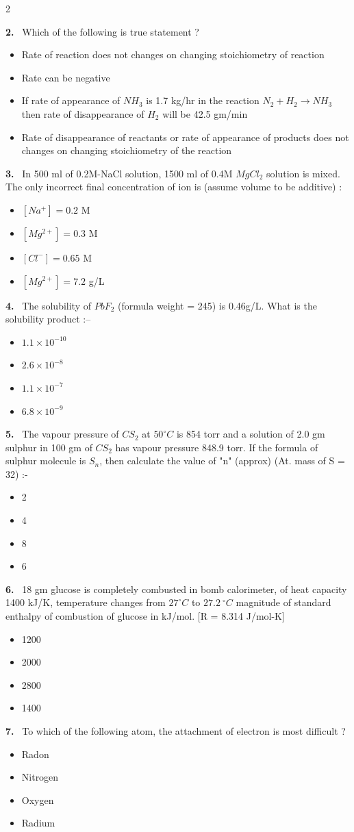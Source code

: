 \documentclass[10pt]{extarticle}
\newcommand{\qn}[1]{\par\smallskip\noindent\textbf{#1.}~}
\newenvironment{qoptions}{\begin{itemize}[leftmargin=1.8em,itemsep=1pt,topsep=2pt,label={}]}{\end{itemize}}
\newcommand{\opt}[2]{\item[(#1)] #2}
\begin{document}
\begin{multicols}{2}
\qn{2} Which of the following is true statement ?
\begin{qoptions}
\opt{A}{Rate of reaction does not changes on changing stoichiometry of reaction}
\opt{B}{Rate can be negative}
\opt{C}{If rate of appearance of $NH_3$ is 1.7 kg/hr in the reaction $N_2+H_2\longrightarrow NH_3$ then rate of disappearance of $H_2$ will be 42.5 gm/min}
\opt{D}{Rate of disappearance of reactants or rate of appearance of products does not changes on changing stoichiometry of the reaction}
\end{qoptions}

\qn{3} In 500 ml of 0.2M-NaCl solution, 1500 ml of 0.4M $MgCl_2$ solution is mixed. The only incorrect final concentration of ion is (assume volume to be additive) :
\begin{qoptions}
\opt{A}{$[Na^+]=0.2$ M}
\opt{B}{$[Mg^{2+}]=0.3$ M}
\opt{C}{$[Cl^-]=0.65$ M}
\opt{D}{$[Mg^{2+}]=7.2$ g/L}
\end{qoptions}

\qn{4} The solubility of $PbF_2$ (formula weight = 245) is 0.46g/L. What is the solubility product :--
\begin{qoptions}
\opt{A}{$1.1\times10^{-10}$}
\opt{B}{$2.6\times10^{-8}$}
\opt{C}{$1.1\times10^{-7}$}
\opt{D}{$6.8\times10^{-9}$}
\end{qoptions}

\qn{5} The vapour pressure of $CS_2$ at $50^\circ C$ is 854 torr and a solution of 2.0 gm sulphur in 100 gm of $CS_2$ has vapour pressure 848.9 torr. If the formula of sulphur molecule is $S_n$, then calculate the value of "n" (approx) (At. mass of S = 32) :-\\
\begin{qoptions}
\opt{A}{2}
\opt{B}{4}
\opt{C}{8}
\opt{D}{6}
\end{qoptions}

\qn{6} 18 gm glucose is completely combusted in bomb calorimeter, of heat capacity 1400 kJ/K, temperature changes from $27^\circ C$ to $27.2\ ^\circ C$ magnitude of standard enthalpy of combustion of glucose in kJ/mol. [R = 8.314 J/mol-K]
\begin{qoptions}
\opt{A}{1200}
\opt{B}{2000}
\opt{C}{2800}
\opt{D}{1400}
\end{qoptions}

\qn{7} To which of the following atom, the attachment of electron is most difficult ?
\begin{qoptions}
\opt{A}{Radon}
\opt{B}{Nitrogen}
\opt{C}{Oxygen}
\opt{D}{Radium}
\end{qoptions}


\end{multicols}
\end{document}
